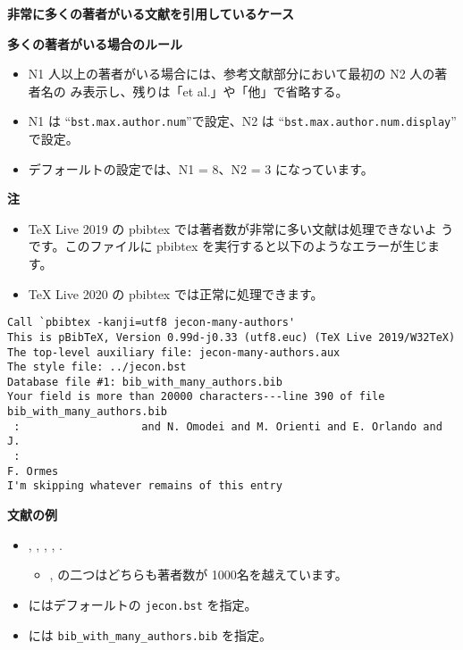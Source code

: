 \documentclass[article]{jlreq}
\begin{document}
\begin{flushleft}
{\Large \textbf{非常に多くの著者がいる文献を引用しているケース}} 
\end{flushleft}

\vspace*{2em}

\textbf{多くの著者がいる場合のルール}
\begin{itemize}
 \item N1 人以上の著者がいる場合には、参考文献部分において最初の N2 人の著者名の
       み表示し、残りは「et al.」や「他」で省略する。
 \item N1 は ``\texttt{bst.max.author.num}''で設定、N2 は
       ``\texttt{bst.max.author.num.display}'' で設定。
 \item デフォールトの設定では、N1 = 8、N2 = 3 になっています。
\end{itemize}

\vspace*{1em}

\textbf{注}
\begin{itemize}
 \item TeX Live 2019 の pbibtex では著者数が非常に多い文献は処理できないよ
       うです。このファイルに pbibtex を実行すると以下のようなエラーが生じます。
 \item TeX Live 2020 の pbibtex では正常に処理できます。
\end{itemize}

\small       
\begin{screen}
\begin{verbatim}
Call `pbibtex -kanji=utf8 jecon-many-authors'
This is pBibTeX, Version 0.99d-j0.33 (utf8.euc) (TeX Live 2019/W32TeX)
The top-level auxiliary file: jecon-many-authors.aux
The style file: ../jecon.bst
Database file #1: bib_with_many_authors.bib
Your field is more than 20000 characters---line 390 of file bib_with_many_authors.bib
 :                   and N. Omodei and M. Orienti and E. Orlando and J. 
 :                                                                      F. Ormes
I'm skipping whatever remains of this entry
\end{verbatim}
\end{screen}
\normalsize

\vspace*{1em}

\textbf{文献の例}
\begin{itemize}
 \item \citet{haigan_2019},
       \citet{130004469434},
       \citet{Pilia_2020},
       \citet{Abbott_2016},
       \citet{Aad_20121}.
       \begin{itemize}
        \item \citet{Abbott_2016}, \citet{Aad_20121} の二つはどちらも著者数が
              1000名を越えています。
       \end{itemize}
 \item \verb|| にはデフォールトの \verb|jecon.bst| を指定。
 \item \verb|| には \verb|bib_with_many_authors.bib| を指定。
\end{itemize}

%


%

\end{document}
